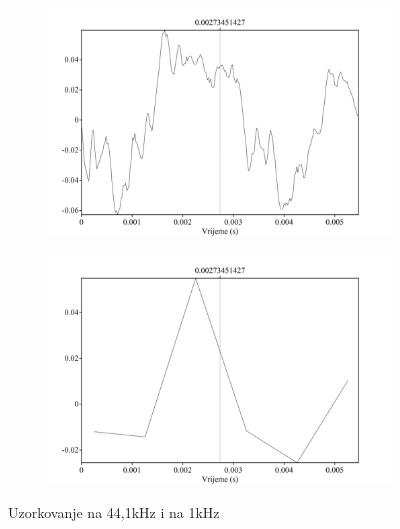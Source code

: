 \documentclass[a4paper]{article}
\begin{document}
    \begin{figure}[h]
        \centering
        \begin{subfigure}[t]{0.49\textwidth}
            \centering
            \includegraphics[width=1\textwidth]{Uzorkovanje1}
        \end{subfigure}
        \hfill
        \begin{subfigure}[t]{0.49\textwidth}
            \centering
            \includegraphics[width=1\textwidth]{Uzorkovanje2}
        \end{subfigure}
        \caption{Uzorkovanje na 44,1kHz i na 1kHz}
        \label{fig:slika2}
    \end{figure}
    
    
\end{document}
